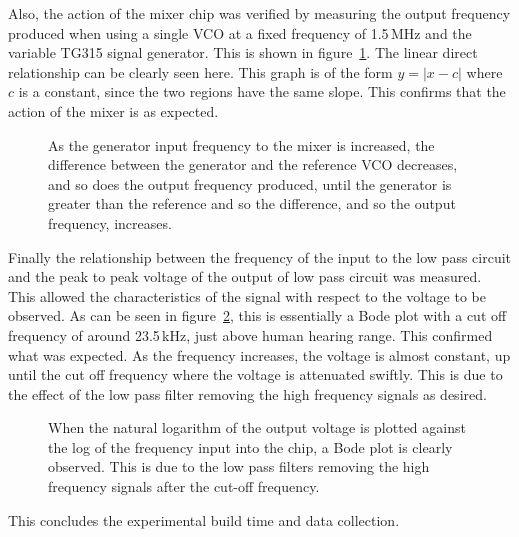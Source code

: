 Also, the action of the mixer chip was verified by measuring the output frequency produced when using a single VCO at a fixed frequency of 1.5\,MHz and the variable TG315 signal generator. This is shown in figure~\ref{fig:frequency generator}. The linear direct relationship can be clearly seen here. This graph is of the form $y=|x-c|$ where $c$ is a constant, since the two regions have the same slope. This confirms that the action of the mixer is as expected.  

\begin{figure}
	\begin{center}
		
		\caption{As the generator input frequency to the mixer is increased, the difference between the generator and the reference VCO decreases, and so does the output frequency produced, until the generator is greater than the reference and so the difference, and so the output frequency, increases.}
		\label{fig:frequency generator}
	\end{center}
\end{figure}

Finally the relationship between the frequency of the input to the low pass circuit and the peak to peak voltage of the output of low pass circuit was measured. This allowed the characteristics of the signal with respect to the voltage to be observed. As can be seen in figure~\ref{fig:bode}, this is essentially a Bode plot with a cut off frequency of around 23.5\,kHz, just above human hearing range. This confirmed what was expected. As the frequency increases, the voltage is almost constant, up until the cut off frequency where the voltage is attenuated swiftly. This is due to the effect of the low pass filter removing the high frequency signals as desired.

\begin{figure}
	\begin{center}
		
		\vspace{-20pt}
		\caption{When the natural logarithm of the output voltage is plotted against the log of the frequency input into the chip, a Bode plot is clearly observed. This is due to the low pass filters removing the high frequency signals after the cut-off frequency.}
		\label{fig:bode}
	\end{center}
\end{figure}

This concludes the experimental build time and data collection.

\newpage
